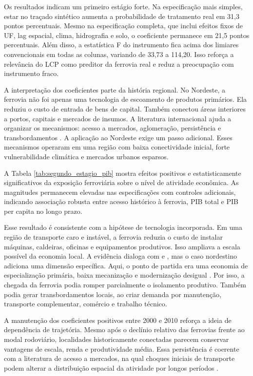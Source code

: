 \documentclass[12pt,a4paper]{article}
\begin{document}
Os resultados indicam um primeiro estágio forte. Na especificação mais simples, estar no traçado sintético aumenta a probabilidade de tratamento real em 31,3 pontos percentuais. Mesmo na especificação completa, que inclui efeitos fixos de UF, lag espacial, clima, hidrografia e solo, o coeficiente permanece em 21,5 pontos percentuais. Além disso, a estatística F do instrumento fica acima dos limiares convencionais em todas as colunas, variando de 33,73 a 114,20. Isso reforça a relevância do LCP como preditor da ferrovia real e reduz a preocupação com instrumento fraco.


A interpretação dos coeficientes parte da história regional. No Nordeste, a ferrovia não foi apenas uma tecnologia de escoamento de produtos primários. Ela reduziu o custo de entrada de bens de capital. Também conectou áreas interiores a portos, capitais e mercados de insumos. A literatura internacional ajuda a organizar os mecanismos: acesso a mercados, aglomeração, persistência e transbordamentos \citep{donaldsonhornbeck2016,donaldson2018,berger2017,jedwab2016}. A aplicação ao Nordeste exige um passo adicional. Esses mecanismos operaram em uma região com baixa conectividade inicial, forte vulnerabilidade climática e mercados urbanos esparsos.


A Tabela \ref{tab:segundo_estagio_pib} mostra efeitos positivos e estatisticamente significativos da exposição ferroviária sobre o nível de atividade econômica. As magnitudes permanecem elevadas nas especificações com controles adicionais, indicando associação robusta entre acesso histórico à ferrovia, PIB total e PIB per capita no longo prazo.

Esse resultado é consistente com a hipótese de tecnologia incorporada. Em uma região de transporte caro e instável, a ferrovia reduzia o custo de instalar máquinas, caldeiras, oficinas e equipamentos produtivos. Isso ampliava a escala possível da economia local. A evidência dialoga com \citet{atack2010} e \citet{hornung2015}, mas o caso nordestino adiciona uma dimensão específica. Aqui, o ponto de partida era uma economia de especialização primária, baixa mecanização e modernização desigual \citep{furtado1959,eisenberg1974}. Por isso, a chegada da ferrovia podia romper parcialmente o isolamento produtivo. Também podia gerar transbordamentos locais, ao criar demanda por manutenção, transporte complementar, comércio e trabalho técnico.

A manutenção dos coeficientes positivos entre 2000 e 2010 reforça a ideia de dependência de trajetória. Mesmo após o declínio relativo das ferrovias frente ao modal rodoviário, localidades historicamente conectadas parecem conservar vantagens de escala, renda e produtividade média. Essa persistência é coerente com a literatura de acesso a mercados, na qual choques iniciais de transporte podem alterar a distribuição espacial da atividade por longos períodos \citep{donaldsonhornbeck2016,donaldson2018}.
\end{document}
